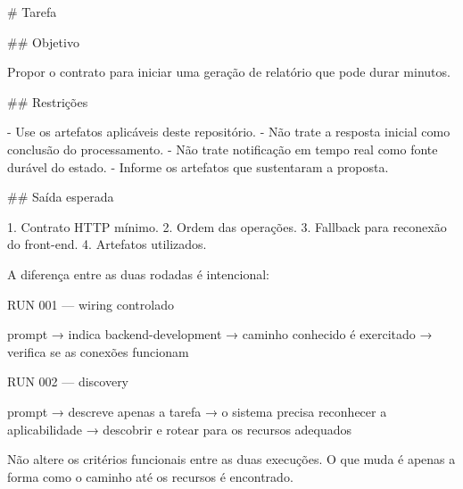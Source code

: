 \documentclass[
  10pt,
  a4paper,
  oneside]{book}
\newenvironment{Shaded}{}{}
\newcommand{\FunctionTok}[1]{\textcolor[rgb]{0.02,0.16,0.49}{#1}}
\newcommand{\NormalTok}[1]{#1}
\newcommand{\SpecialStringTok}[1]{\textcolor[rgb]{0.73,0.40,0.53}{#1}}
\renewenvironment{Shaded}{\begin{snugshade}}{\end{snugshade}}%
\begin{document}
\begin{Shaded}
\begin{Highlighting}[]
\FunctionTok{\# Tarefa}

\FunctionTok{\#\# Objetivo}

\NormalTok{Propor o contrato para iniciar uma geração de relatório que pode durar minutos.}

\FunctionTok{\#\# Restrições}

\SpecialStringTok{{-} }\NormalTok{Use os artefatos aplicáveis deste repositório.}
\SpecialStringTok{{-} }\NormalTok{Não trate a resposta inicial como conclusão do processamento.}
\SpecialStringTok{{-} }\NormalTok{Não trate notificação em tempo real como fonte durável do estado.}
\SpecialStringTok{{-} }\NormalTok{Informe os artefatos que sustentaram a proposta.}

\FunctionTok{\#\# Saída esperada}

\SpecialStringTok{1. }\NormalTok{Contrato HTTP mínimo.}
\SpecialStringTok{2. }\NormalTok{Ordem das operações.}
\SpecialStringTok{3. }\NormalTok{Fallback para reconexão do front{-}end.}
\SpecialStringTok{4. }\NormalTok{Artefatos utilizados.}
\end{Highlighting}
\end{Shaded}

A diferença entre as duas rodadas é intencional:

\begin{Shaded}
\begin{Highlighting}[]
\NormalTok{RUN 001 — wiring controlado}

\NormalTok{prompt}
\NormalTok{→ indica backend{-}development}
\NormalTok{→ caminho conhecido é exercitado}
\NormalTok{→ verifica se as conexões funcionam}
\end{Highlighting}
\end{Shaded}

\begin{Shaded}
\begin{Highlighting}[]
\NormalTok{RUN 002 — discovery}

\NormalTok{prompt}
\NormalTok{→ descreve apenas a tarefa}
\NormalTok{→ o sistema precisa reconhecer a aplicabilidade}
\NormalTok{→ descobrir e rotear para os recursos adequados}
\end{Highlighting}
\end{Shaded}

Não altere os critérios funcionais entre as duas execuções. O que muda é
apenas a forma como o caminho até os recursos é encontrado.
\end{document}
